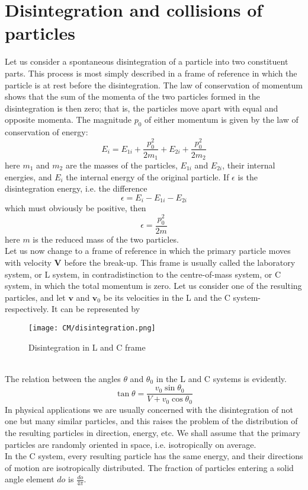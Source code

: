 \documentclass[cyan]{elegantnote}
\begin{document}
\section{Disintegration and collisions of particles}
Let us consider a spontaneous disintegration of a particle into two constituent parts. 
This process is most simply described in a frame of reference in which the particle is at rest before the disintegration.
The law of conservation of momentum shows that the sum of the momenta of the two particles formed in the disintegration is then zero; that is, the particles move apart with equal and
opposite momenta. The magnitude $p_0$ of either momentum is given by the law of conservation of energy:
\[E_i = E_{1i} + \frac{p_0^2}{2m_1} + E_{2i} + \frac{p_0^2}{2m_2}\]
here $m_1$ and $m_2$ are the masses of the particles, $E_{1i}$ and $E_{2i}$, their internal energies, and $E_{i}$ the internal energy of the original particle. If $\epsilon$ is the disintegration energy, i.e. the difference
\[\epsilon = E_i - E_{1i} - E_{2i}\]
which must obviously be positive, then
\[\epsilon = \frac{p_0^2}{2m}\]
here $m$ is the reduced mass of the two particles.\\
Let us now change to a frame of reference in which the primary particle moves with velocity $\bm{V}$ before the break-up. 
This frame is usually called the laboratory system, or L system, in contradistinction to the centre-of-mass
system, or C system, in which the total momentum is zero. 
Let us consider one of the resulting particles, and let $\bm{v}$ and $\bm{v}_0$ be its velocities in the L and
the C system-respectively. It can be represented by
\begin{figure}[!h]
	\centering
	\texttt{[image: CM/disintegration.png]}
	\caption{Disintegration in L and C frame}
\end{figure}\\
The relation between the angles $\theta$ and $\theta_0$ in the L and C systems is evidently.
\[\tan\theta = \frac{v_0\sin\theta_0}{V+v_0\cos\theta_0}\]
In physical applications we are usually concerned with the disintegration of not one but many similar particles, and this raises the problem of the distribution of the resulting particles in direction, energy, etc. 
We shall assume that the primary particles are randomly oriented in space, i.e. isotropically on average.\\
In the C system, every resulting particle has the same energy, and their directions of motion are isotropically distributed. The fraction of particles entering a solid angle element $do$ is $\frac{do}{4\pi}$. 
\end{document}
